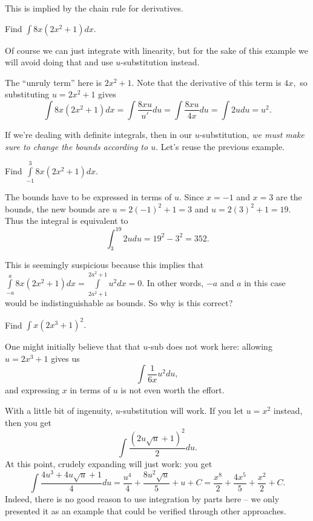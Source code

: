 \documentclass[mast]{lucky}
\begin{document}
This is implied by the chain rule for derivatives.

\begin{exam}
Find $\int 8x(2x^2+1)dx.$
\end{exam}

\begin{sol}
Of course we can just integrate with linearity, but for the sake of this example we will avoid doing that and use $u$-substitution instead.

The ``unruly term'' here is $2x^2+1.$ Note that the derivative of this term is $4x,$ so substituting $u=2x^2+1$ gives
\[\int 8x(2x^2+1)dx=\int \frac{8xu}{u'}du=\int\frac{8xu}{4x}du=\int 2udu=u^2.\]
\end{sol}

If we're dealing with definite integrals, then in our $u$-substitution, \emph{we must make sure to change the bounds according to $u$}. Let's reuse the previous example.

\begin{exam}
Find $\int\limits_{-1}^{3} 8x(2x^2+1)dx.$
\end{exam}

\begin{sol}
The bounds have to be expressed in terms of $u$. Since $x=-1$ and $x=3$ are the bounds, the new bounds are $u=2(-1)^2+1=3$ and $u=2(3)^2+1=19.$ Thus the integral is equivalent to
\[\int_{3}^{19}2udu=19^2-3^2=352.\]
\end{sol}

\begin{exer}
This is seemingly suspicious because this implies that $\int\limits_{-a}^{a} 8x(2x^2+1)dx=\int\limits_{2a^2+1}^{2a^2+1}u^2dx=0.$ In other words, $-a$ and $a$ in this case would be indistinguishable as bounds. So why is this correct?
\end{exer} %

\begin{exam}
Find $\int x(2x^3+1)^2.$
\end{exam}

\begin{remark}
One might initially believe that that $u$-sub does not work here: allowing $u=2x^3+1$ gives us
\[\int \frac{1}{6x}u^2 du,\]
and expressing $x$ in terms of $u$ is not even worth the effort.
\end{remark}

\begin{sol}
With a little bit of ingenuity, $u$-substitution will work. If you let $u=x^2$ instead, then you get
\[\int \frac{(2u\sqrt{u}+1)^2}{2}du.\]
At this point, crudely expanding will just work: you get
\[\int \frac{4u^3+4u\sqrt{u}+1}{4}du=\frac{u^4}{4}+\frac{8u^2\sqrt{u}}{5}+u+C=\frac{x^8}{2}+\frac{4x^5}{5}+\frac{x^2}{2}+C.\]
Indeed, there is no good reason to use integration by parts here -- we only presented it as an example that could be verified through other approaches.
\end{sol}
\end{document}
